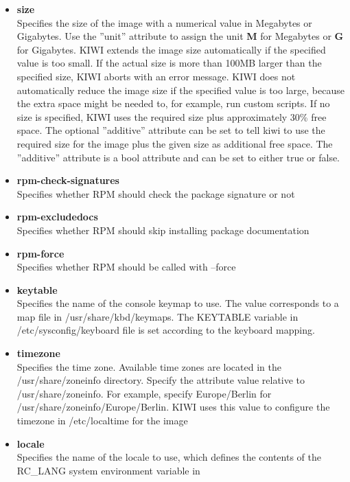 \begin{itemize}
\item \textbf{size}\\
      Specifies the size of the image with a numerical value in
      Megabytes or Gigabytes. Use the ''unit'' attribute to assign the
      unit \textbf{M} for Megabytes or \textbf{G} for Gigabytes.
      KIWI extends the image size automatically if the specified value
      is too small. If the actual size is more than 100MB larger than
      the specified size, KIWI aborts with an error
      message. KIWI does not automatically reduce the image size if
      the specified value is too large, because the extra space might
      be needed to, for example, run custom scripts. If no size is
      specified, KIWI uses the required size plus approximately
      30\% free space. The optional ''additive'' attribute can be set
      to tell kiwi to use the required size for the image plus the
      given size as additional free space. The ''additive'' attribute is
      a bool attribute and can be set to either true or false.
\item \textbf{rpm-check-signatures}\\
      Specifies whether RPM should check the package signature or not
\item \textbf{rpm-excludedocs}\\
      Specifies whether RPM should skip installing package documentation
\item \textbf{rpm-force}\\
      Specifies whether RPM should be called with --force
\item \textbf{keytable}\\
      Specifies the name of the console keymap to use. The value corresponds
      to a map file in /usr/share/kbd/keymaps. The KEYTABLE variable in
      /etc/sysconfig/keyboard file is set according to the keyboard
      mapping.
\item \textbf{timezone}\\
      Specifies the time zone. Available time zones are located in the
      /usr/share/zoneinfo directory. Specify the attribute value relative to
      /usr/share/zoneinfo. For example, specify Europe/Berlin for
      /usr/share/zoneinfo/Europe/Berlin. KIWI uses this value to configure
      the timezone in /etc/localtime for the image
\item \textbf{locale}\\
      Specifies the name of the locale to use, which defines the
      contents of the RC\_LANG system environment variable in

\end{itemize}
